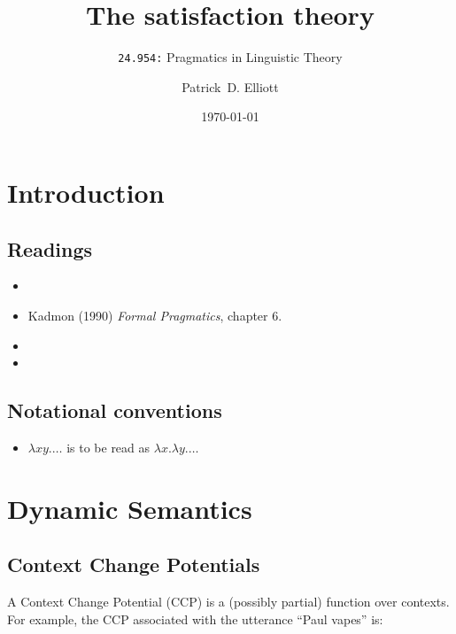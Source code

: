 \documentclass[cronos,landscape,paper=letter]{ling-handout}
\title{The satisfaction theory}
\subtitle{\texttt{24.954:} Pragmatics in Linguistic Theory}
\date{\today}
\author{Patrick~D. Elliott}
\begin{document}
\maketitle

\section{Introduction}

\subsection{Readings}

\begin{itemize}

    \item {}

    \item Kadmon (1990) \textit{Formal Pragmatics}, chapter 6.

    \item {}

    \item {}

\end{itemize}

\subsection{Notational conventions}

\begin{itemize}

    \item \(λxy . …\) is to be read as \(λ x . λ y . …\)


\end{itemize}

\section{Dynamic Semantics}

\subsection{Context Change Potentials}

A Context Change Potential (CCP) is a (possibly partial) function over contexts. For example, the CCP associated with the utterance \enquote{Paul vapes} is:
\end{document}
